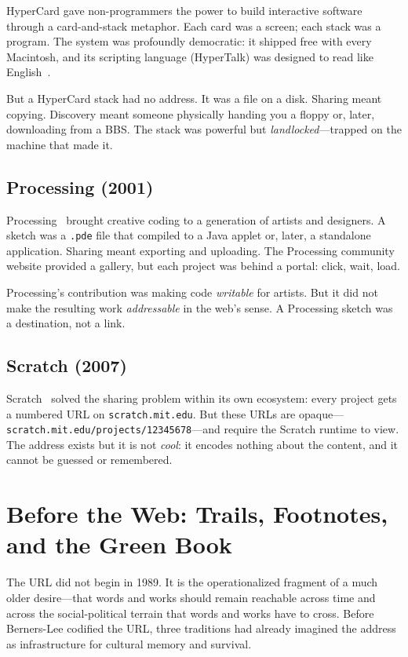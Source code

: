 \documentclass[10pt,letterpaper,twocolumn]{article}
\newcommand{\code}[1]{\texttt{#1}}
\begin{document}
HyperCard gave non-programmers the power to build interactive software through a card-and-stack metaphor. Each card was a screen; each stack was a program. The system was profoundly democratic: it shipped free with every Macintosh, and its scripting language (HyperTalk) was designed to read like English~\citep{atkinson1987hypercard}.

But a HyperCard stack had no address. It was a file on a disk. Sharing meant copying. Discovery meant someone physically handing you a floppy or, later, downloading from a BBS. The stack was powerful but \emph{landlocked}---trapped on the machine that made it.

\subsection{Processing (2001)}

Processing~\citep{reas2007processing} brought creative coding to a generation of artists and designers. A sketch was a \code{.pde} file that compiled to a Java applet or, later, a standalone application. Sharing meant exporting and uploading. The Processing community website provided a gallery, but each project was behind a portal: click, wait, load.

Processing's contribution was making code \emph{writable} for artists. But it did not make the resulting work \emph{addressable} in the web's sense. A Processing sketch was a destination, not a link.

\subsection{Scratch (2007)}

Scratch~\citep{resnick2009scratch} solved the sharing problem within its own ecosystem: every project gets a numbered URL on \code{scratch.mit.edu}. But these URLs are opaque---\code{scratch.mit.edu/projects/12345678}---and require the Scratch runtime to view. The address exists but it is not \emph{cool}: it encodes nothing about the content, and it cannot be guessed or remembered.

\section{Before the Web: Trails, Footnotes, and the Green Book}

The URL did not begin in 1989. It is the operationalized fragment of a much older desire---that words and works should remain reachable across time and across the social-political terrain that words and works have to cross. Before Berners-Lee codified the URL, three traditions had already imagined the address as infrastructure for cultural memory and survival.
\end{document}
